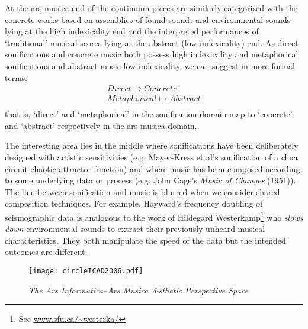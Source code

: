 \documentclass{article}
\begin{document}
At the ars musica end of the continuum pieces are similarly categorised with the concrete works based on assemblies of found sounds and environmental sounds lying at the high indexicality end and the interpreted performances of `traditional' musical scores lying at the abstract (low indexicality) end. As direct sonifications and concrete music both possess high indexicality and metaphorical sonifications and abstract music low indexicality, we can suggest in more formal terms: 
\begin{equation} 
\begin{array}{l}
Direct \mapsto Concrete\\
Metaphorical \mapsto Abstract\\
\end{array}
\label{eq1} 
\end{equation} 
that is, `direct' and `metaphorical' in the sonification domain map to `concrete' and `abstract' respectively in the ars musica domain.

The interesting area lies in the middle where sonifications have been deliberately designed with artistic sensitivities (e.g. Mayer-Kress et al's \cite{Mayer-Kress:1994} sonification of a chua circuit chaotic attractor function) and where music has been composed according to some underlying data or process (e.g. John Cage's \textit{Music of Changes} (1951)). The line between sonification and music is blurred when we consider shared composition techniques. For example, Hayward's \cite{Hayward:1994} frequency doubling of seismographic data is analogous to the work of Hildegard Westerkamp\footnote{See \url{www.sfu.ca/~westerka/}} who \textit{slows down} environmental sounds to extract their previously unheard musical characteristics. They both manipulate the speed of the data but the intended outcomes are different.
\begin{figure*}[ht] 
\centering
\texttt{[image: circleICAD2006.pdf]} 
\caption{{\it The Ars Informatica--Ars Musica Æsthetic Perspective Space}}   
\label{fig:circle} 
\end{figure*} 
\end{document}
